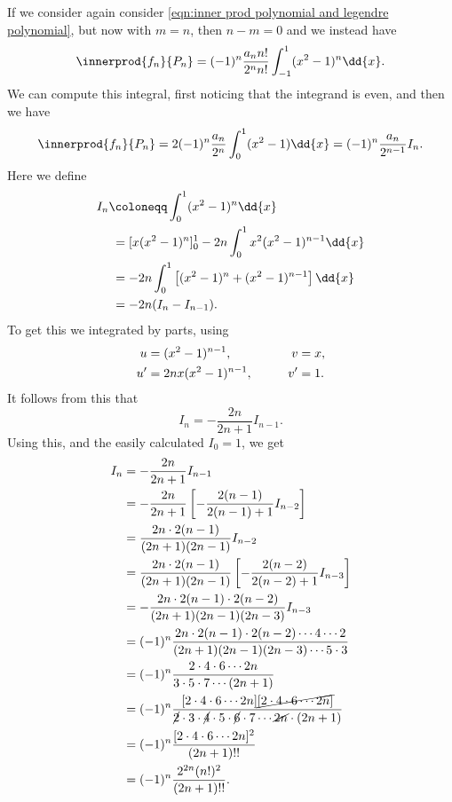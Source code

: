 \documentclass[fleqn]{NotesClass}
\begin{document}
    If we consider again consider \cref{eqn:inner prod polynomial and legendre polynomial}, but now with \(m = n\), then \(n - m = 0\) and we instead have
    \begin{equation}
        \innerprod{f_n}{P_n} = (-1)^n \frac{a_nn!}{2^nn!} \int_{-1}^{1} (x^2 - 1)^n \dd{x}.
    \end{equation}
    We can compute this integral, first noticing that the integrand is even, and then we have
    \begin{equation}\label{eqn:inner prod fn Pn}
        \innerprod{f_n}{P_n} = 2(-1)^n \frac{a_n}{2^n} \int_{0}^1 (x^2 - 1) \dd{x} = (-1)^{n}\frac{a_n}{2^{n-1}} I_n.
    \end{equation}
    Here we define
    \begin{align}
        I_n &\coloneqq \int_0^1 (x^2 - 1)^n \dd{x}\\
        &\hphantom{:}= [x(x^2 - 1)^n]_{0}^{1} - 2n\int_0^1 x^2(x^2 - 1)^{n-1} \dd{x}\\
        &\hphantom{:}= -2n\int_{0}^{1} \left[ (x^2 - 1)^n + (x^2 - 1)^{n-1} \right] \dd{x}\\
        &\hphantom{:}= -2n(I_n - I_{n-1}).
    \end{align}
    To get this we integrated by parts, using
    \begin{alignat}{2}
        u &= (x^2 - 1)^{n-1},     \qquad && \hphantom{'}v= x,\\
        u' &= 2nx(x^2 - 1)^{n-1}, \qquad && v'= 1.
    \end{alignat}
    It follows from this that
    \begin{equation}
        I_n = -\frac{2n}{2n + 1} I_{n-1}.
    \end{equation}
    Using this, and the easily calculated \(I_0 = 1\), we get
    \begin{align}
        I_n &= -\frac{2n}{2n + 1}I_{n - 1}\\
        &= -\frac{2n}{2n + 1}\left[ -\frac{2(n-1)}{2(n - 1) + 1}I_{n-2} \right]\\
        &= \frac{2n\cdot 2(n-1)}{(2n+1)(2n-1)}I_{n-2}\\
        &= \frac{2n\cdot 2(n-1)}{(2n+1)(2n-1)}\left[ -\frac{2(n-2)}{2(n-2) + 1}I_{n-3} \right]\\
        &= -\frac{2n\cdot 2(n-1) \cdot 2(n-2)}{(2n+1)(2n-1)(2n-3)}I_{n-3}\\
        &= (-1)^{n} \frac{2n \cdot 2(n - 1) \cdot 2(n - 2) \dotsm 4 \dotsm 2}{(2n + 1)(2n - 1)(2n - 3) \dotsm 5\cdot 3}\\
        &= (-1)^n \frac{2 \cdot 4 \cdot 6 \dotsm 2n}{3 \cdot 5 \cdot 7 \dotsm (2n + 1)}\\
        &= (-1)^n \frac{[2 \cdot 4 \cdot 6 \dotsm 2n]\cancel{[2\cdot 4\cdot 6 \dotsm 2n]}}{\cancel{2}\cdot 3 \cdot \cancel{4} \cdot 5 \cdot \cancel{6} \cdot 7 \dotsm \cancel{2n} \cdot (2n + 1)}\\
        &= (-1)^n \frac{[2 \cdot 4 \cdot 6 \dotsm 2n]^2}{(2n + 1)!!}\\
        &= (-1)^n \frac{2^{2n}(n!)^2}{(2n+1)!!}.
    \end{align}
\end{document}
